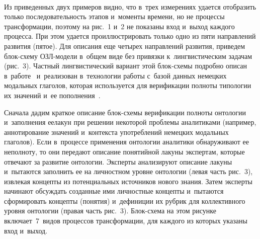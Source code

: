 {\begin{multicols}{2}
\begin{figure*}[b] %
\vspace*{6pt}
 \begin{center}
 \mbox{%
 \epsfxsize=163mm 
 }
 \end{center}
   \vspace*{-9pt}
\end{figure*}

  
  Из приведенных двух примеров видно, что в~трех измерениях удается 
отобразить только последовательность этапов и~моменты времени, но не 
процессы трансформации, поэтому на рис.~1 и~2 не показаны вход и~выход 
каждого процесса. При этом удается проиллюстрировать только одно из пяти 
направлений развития (пятое). Для описания еще четырех направлений 
развития, приведем блок-схе\-му ОЗЛ-мо\-де\-ли в~общем виде без привязки 
к~лингвистическим задачам (рис.~3). Частный лингвистический вариант этой 
блок-схемы подробно описан в~работе~\cite{20-zac} и~реализован в~технологии 
работы с~базой данных немецких модальных глаголов, которая используется 
для верификации полноты типологии их значений и~ее  
пополнения~\cite{2-zac, 3-zac, 16-zac}.
{

}
  
  Сначала дадим краткое описание блок-схе\-мы верификации полноты 
онтологии и~заполнения ее\linebreak лакун при решении некоторой проблемы 
аналитиками (например, аннотирование значений и~контекста употреблений 
немецких модальных глаголов). Если в~процессе применения онтологии\linebreak 
аналитики обнаруживают ее неполноту, то они передают описание понятийной 
лакуны экспертам, которые отвечают за развитие онтологии. Эксперты 
анализируют описание лакуны и~пытаются заполнить ее на личностном уровне 
онтологии (левая часть рис.~3), извлекая концепты из потенциальных 
источников нового знания. Затем эксперты начинают обсуждать созданные ими 
личностные кон\-цеп\-ты и~пытаются сформировать концепты (понятия) 
и~дефиниции их рубрик для коллективного уровня онтологии (правая часть 
рис.~3). Блок-схе\-ма на этом рисунке включает~7~видов процессов 
трансформации, для каждого из которых указаны вход и~выход.
  

\end{multicols}}
